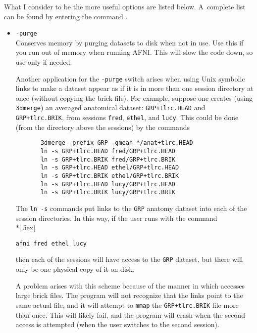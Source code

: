 What I consider to be the more useful options are listed below.
A~complete list can be found by entering the command .
\begin{itemize}
   \item {\tt -purge}\\
         Conserves memory by purging datasets to disk when not in use.
         Use this if you run out of memory when running AFNI.
         This will slow the code down, so use only if needed.

         Another application for the {\tt -purge} switch arises when
         using Unix symbolic links to make a dataset appear as if it is in more
         than one session directory at once (without copying the brick file).
         For example, suppose one creates (using {\tt 3dmerge}) an averaged
         anatomical dataset: {\tt GRP+tlrc.HEAD} and {\tt GRP+tlrc.BRIK}, from
         sessions {\tt fred}, {\tt ethel}, and {\tt lucy}.  This could be done
         (from the directory above the sessions) by the commands
\goodbreak\begin{samepage}\begin{verbatim}
       3dmerge -prefix GRP -gmean */anat+tlrc.HEAD
       ln -s GRP+tlrc.HEAD fred/GRP+tlrc.HEAD
       ln -s GRP+tlrc.BRIK fred/GRP+tlrc.BRIK
       ln -s GRP+tlrc.HEAD ethel/GRP+tlrc.HEAD
       ln -s GRP+tlrc.BRIK ethel/GRP+tlrc.BRIK
       ln -s GRP+tlrc.HEAD lucy/GRP+tlrc.HEAD
       ln -s GRP+tlrc.BRIK lucy/GRP+tlrc.BRIK
\end{verbatim}\end{samepage}\goodbreak
        The {\tt ln -s} commands put links to the {\tt GRP} anatomy dataset into
        each of the session directories.  In this way, if the user runs \afnit
        with the command\\*[.5ex]
        \centerline{\tt afni fred ethel lucy}\vspace{.5ex}
        then each of the sessions will have access to the {\tt GRP} dataset,
        but there will only be one physical copy of it on disk.

        A problem arises with this scheme
        because of the manner in which \afnit accesses large brick files.
        The program will not recognize
        that the links point to the same actual file, and it will attempt
        to {\tt mmap} the {\tt GRP+tlrc.BRIK} file more than once.  This
        will likely fail, and the program will crash when the second access
        is attempted (when the user switches to the second session).


\end{itemize}
